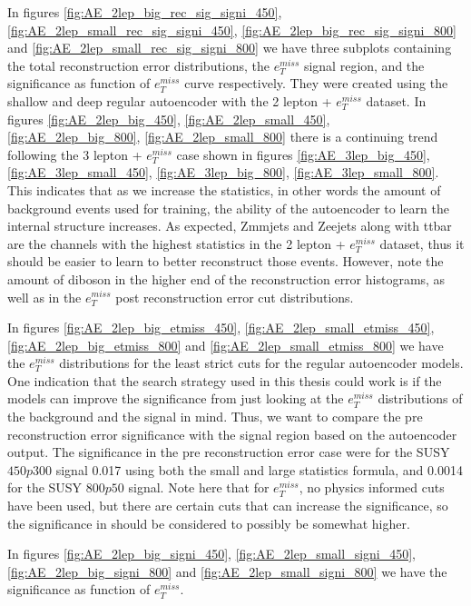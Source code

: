 In figures \ref{fig:AE_2lep_big_rec_sig_signi_450}, \ref{fig:AE_2lep_small_rec_sig_signi_450}, 
\ref{fig:AE_2lep_big_rec_sig_signi_800} and \ref{fig:AE_2lep_small_rec_sig_signi_800} we have three 
subplots containing the total reconstruction error distributions, the $e_T^{miss}$ signal region, 
and the significance as function of $e_T^{miss}$ curve respectively. They were created using 
the shallow and deep regular autoencoder with the 2 lepton + $e_T^{miss}$ dataset.
In figures \ref{fig:AE_2lep_big_450}, \ref{fig:AE_2lep_small_450}, \ref{fig:AE_2lep_big_800}, 
\ref{fig:AE_2lep_small_800} there is a continuing trend following the 3 
lepton + $e_T^{miss}$ case shown in figures \ref{fig:AE_3lep_big_450}, \ref{fig:AE_3lep_small_450},
\ref{fig:AE_3lep_big_800}, \ref{fig:AE_3lep_small_800}. This indicates that as we increase the 
statistics, in other words the amount of background events 
used for training, the ability of the autoencoder to learn the internal structure increases. 
As expected, Zmmjets and Zeejets along with ttbar are the channels with the highest statistics 
in the 2 lepton + $e_T^{miss}$ dataset, thus it should be easier to learn to better reconstruct 
those events. However, note the amount of diboson in the higher end of the reconstruction error 
histograms, as well as in the $e_T^{miss}$ post reconstruction error cut distributions.  \par
In figures \ref{fig:AE_2lep_big_etmiss_450}, \ref{fig:AE_2lep_small_etmiss_450}, \ref{fig:AE_2lep_big_etmiss_800} and  
\ref{fig:AE_2lep_small_etmiss_800} we have the $e_T^{miss}$ distributions for 
the least strict cuts for the regular autoencoder models. One indication that the search strategy 
used in this thesis could work is if the models can improve the significance from just looking at 
the $e_T^{miss}$ distributions of the background and the signal in mind. Thus, we want to compare the pre 
reconstruction error significance with the signal region based on the autoencoder output. The significance 
in the pre reconstruction error case were for the SUSY $450p300$ signal 0.017 using both 
the small and large statistics formula, and 0.0014 for the SUSY $800p50$ signal. Note here that for 
$e_T^{miss}$, no physics informed cuts have been used, but there are certain cuts that can increase 
the significance, so the significance in should be considered to possibly be somewhat higher. \par
In figures \ref{fig:AE_2lep_big_signi_450}, \ref{fig:AE_2lep_small_signi_450}, \ref{fig:AE_2lep_big_signi_800} 
and  \ref{fig:AE_2lep_small_signi_800} we have the significance as function of $e_T^{miss}$. 
